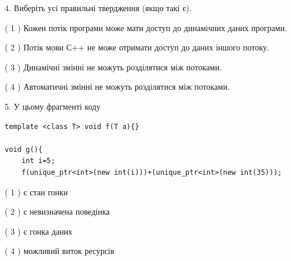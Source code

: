 \documentclass[12pt, ukrainian]{article}
\begin{document}
\begin {large}
{%
4. Виберіть усі правильні твердження (якщо такі є).\par
\vspace{2mm}

( 1 ) Кожен потік програми може мати доступ до динамічних даних програми.%

( 2 ) Потік мови С++ не може отримати доступ до даних іншого потоку.%

( 3 ) Динамічні змінні не можуть розділятися між потоками.%

( 4 ) Автоматичні змінні не можуть розділятися між потоками.%


5. У цьому фрагменті коду
\begin{verbatim}
template <class T> void f(T a){}

void g(){
    int i=5;
    f(unique_ptr<int>(new int(i)))+(unique_ptr<int>(new int(35)));
\end{verbatim}
( 1 ) є стан гонки%

( 2 ) є невизначена поведінка%

( 3 ) є гонка даних%

( 4 ) можливий виток ресурсів%
}
\end {large}
\end{document}
